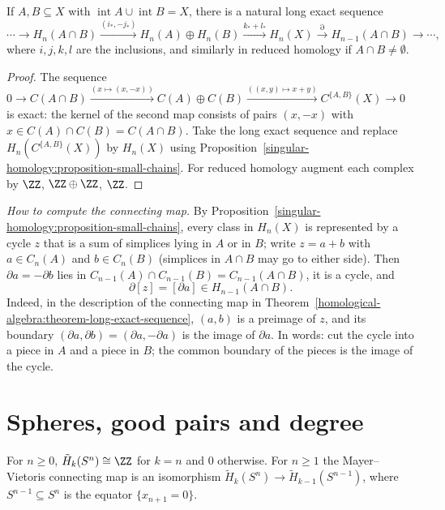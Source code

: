 \begin{theorem}\label{singular-homology:theorem-mayer-vietoris}
If $A, B \subseteq X$ with $\operatorname{int}A \cup \operatorname{int}B = X$, there is a natural long exact sequence
\[
\cdots \to H_n(A \cap B) \xrightarrow{(i_*, -j_*)} H_n(A) \oplus H_n(B) \xrightarrow{k_* + l_*} H_n(X) \xrightarrow{\partial} H_{n-1}(A \cap B) \to \cdots,
\]
where $i, j, k, l$ are the inclusions, and similarly in reduced homology if $A \cap B \neq \emptyset$.
\end{theorem}

\begin{proof}
The sequence $0 \to C(A \cap B) \xrightarrow{(x \mapsto (x, -x))} C(A) \oplus C(B) \xrightarrow{((x, y) \mapsto x + y)} C^{\{A, B\}}(X) \to 0$ is exact: the kernel of the second
map consists of pairs $(x, -x)$ with $x \in C(A) \cap C(B) = C(A \cap B)$. Take the long exact sequence and replace $H_n(C^{\{A,B\}}(X))$ by $H_n(X)$ using
Proposition~\ref{singular-homology:proposition-small-chains}. For reduced homology augment each complex by $\ZZ$, $\ZZ \oplus \ZZ$, $\ZZ$.
\end{proof}

\begin{remark}\label{singular-homology:remark-mayer-vietoris-boundary}
\emph{How to compute the connecting map.} By Proposition~\ref{singular-homology:proposition-small-chains}, every class in $H_n(X)$ is represented by a cycle $z$ that is a sum
of simplices lying in $A$ or in $B$; write $z = a + b$ with $a \in C_n(A)$ and $b \in C_n(B)$ (simplices in $A \cap B$ may go to either side). Then
$\partial a = -\partial b$ lies in $C_{n-1}(A) \cap C_{n-1}(B) = C_{n-1}(A \cap B)$, it is a cycle, and
\[
\partial[z] = [\partial a] \in H_{n-1}(A \cap B).
\]
Indeed, in the description of the connecting map in Theorem~\ref{homological-algebra:theorem-long-exact-sequence}, $(a, b)$ is a preimage of $z$, and its boundary
$(\partial a, \partial b) = (\partial a, -\partial a)$ is the image of $\partial a$. In words: cut the cycle into a piece in $A$ and a piece in $B$; the common boundary of the
pieces is the image of the cycle.
\end{remark}

\section{Spheres, good pairs and degree}\label{singular-homology:section-spheres}

\begin{theorem}\label{singular-homology:theorem-spheres}
For $n \geq 0$, $\tilde{H}_k(S^n) \cong \ZZ$ for $k = n$ and $0$ otherwise. For $n \geq 1$ the Mayer--Vietoris connecting map is an isomorphism
$\tilde{H}_k(S^n) \to \tilde{H}_{k-1}(S^{n-1})$, where $S^{n-1} \subseteq S^n$ is the equator $\{x_{n+1} = 0\}$.
\end{theorem}

